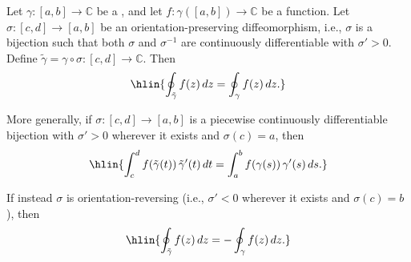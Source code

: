 \begin{proposition} \label{proposition:contour_integral_of_a_complex_valued_functions_along_a_piecewise_continuously_differentiable_path_is_invariant_under_reparametrization}
Let $\gamma : [a,b] \to \mathbb{C}$ be a , and let $f : \gamma([a,b]) \to \mathbb{C}$ be a  function. Let $\sigma : [c,d] \to [a,b]$ be an orientation-preserving diffeomorphism, i.e., $\sigma$ is a bijection such that both $\sigma$ and $\sigma^{-1}$ are continuously differentiable with $\sigma' > 0$. Define $\tilde{\gamma} = \gamma \circ \sigma : [c,d] \to \mathbb{C}$. Then
$$\hlin{\oint_{\tilde{\gamma}} f(z)\,dz = \oint_{\gamma} f(z)\,dz.}$$

More generally, if $\sigma : [c,d] \to [a,b]$ is a piecewise continuously differentiable bijection with $\sigma' > 0$ wherever it exists and $\sigma(c) = a$, then
$$\hlin{\int_c^d f(\tilde{\gamma}(t))\,\tilde{\gamma}'(t)\,dt = \int_a^b f(\gamma(s))\,\gamma'(s)\,ds.}$$

If instead $\sigma$ is orientation-reversing (i.e., $\sigma' < 0$ wherever it exists and $\sigma(c) = b$), then
$$\hlin{\oint_{\tilde{\gamma}} f(z)\,dz = -\oint_{\gamma} f(z)\,dz.}$$
\end{proposition}

